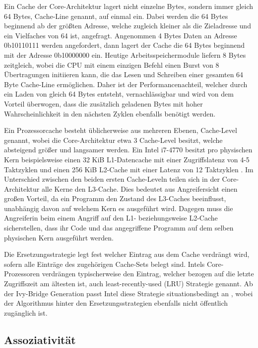 Ein Cache der Core-Architektur lagert nicht einzelne Bytes, sondern immer gleich 64 Bytes, Cache-Line genannt, auf einmal ein. Dabei werden die 64 Bytes beginnend ab der größten Adresse, welche zugleich kleiner als die Zieladresse und ein Vielfaches von 64 ist, angefragt.
Angenommen 4 Bytes Daten an Adresse 0b10110111 werden angefordert, dann lagert der Cache die 64 Bytes beginnend mit der Adresse 0b10000000 ein.
Heutige Arbeitsspeichermodule liefern 8 Bytes zeitgleich, wobei die CPU mit einem einzigen Befehl einen Burst von 8 Übertragungen initiieren kann, die das Lesen und Schreiben einer gesamten 64 Byte Cache-Line ermöglichen.
Daher ist der Performancenachteil, welcher durch ein Laden von gleich 64 Bytes entsteht, vernachlässigbar und wird von dem Vorteil überwogen, dass die zusätzlich geladenen Bytes mit hoher Wahrscheinlichkeit in den nächsten Zyklen ebenfalls benötigt werden.

Ein Prozessorcache besteht üblicherweise aus mehreren Ebenen, Cache-Level genannt, wobei die Core-Architektur etwa 3 Cache-Level besitzt, welche absteigend größer und langsamer werden. Ein Intel i7-4770 besitzt pro physischen Kern beispielsweise einen 32 KiB L1-Datencache mit einer Zugriffslatenz von 4-5 Taktzyklen und einen 256 KiB L2-Cache mit einer Latenz von 12 Taktzyklen \cite{CacheStatsHaswell}.
Im Unterschied zwischen den beiden ersten Cache-Leveln teilen sich in der Core-Architektur alle Kerne den L3-Cache. 
Dies bedeutet aus Angreifersicht einen großen Vorteil, da ein Programm den Zustand des L3-Caches beeinflusst, unabhängig davon auf welchem Kern es ausgeführt wird.
Dagegen muss die Angreiferin beim einem Angriff auf den L1- beziehungsweise L2-Cache sicherstellen, dass ihr Code und das angegriffene Programm auf dem selben physischen Kern ausgeführt werden.

Die Ersetzungsstrategie legt fest welcher Eintrag aus dem Cache verdrängt wird, sofern alle Einträge des zugehörigen Cache-Sets belegt sind. 
Intels Core-Prozessoren verdrängen typischerweise den Eintrag, welcher bezogen auf die letzte Zugriffszeit am ältesten ist, auch least-recently-used (LRU) Strategie genannt. 
Ab der Ivy-Bridge Generation passt Intel diese Strategie situationsbedingt an \cite{CacheReplacementPolicy}, wobei der Algorithmus hinter den Ersetzungsstrategien ebenfalls nicht öffentlich zugänglich ist.

\subsection{Assoziativität}

